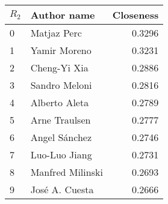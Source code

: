 \begin{tabular}{llr}
\toprule
\(R_2\) &       Author name &  Closeness \\
\midrule
0 &       Matjaz Perc &              0.3296 \\
1 &      Yamir Moreno &              0.3231 \\
2 &      Cheng-Yi Xia &              0.2886 \\
3 &     Sandro Meloni &              0.2816 \\
4 &     Alberto Aleta &              0.2789 \\
5 &     Arne Traulsen &              0.2777 \\
6 &     Angel Sánchez &              0.2746 \\
7 &     Luo-Luo Jiang &              0.2731 \\
8 &  Manfred Milinski &              0.2693 \\
9 &    José A. Cuesta &              0.2666 \\
\bottomrule
\end{tabular}
